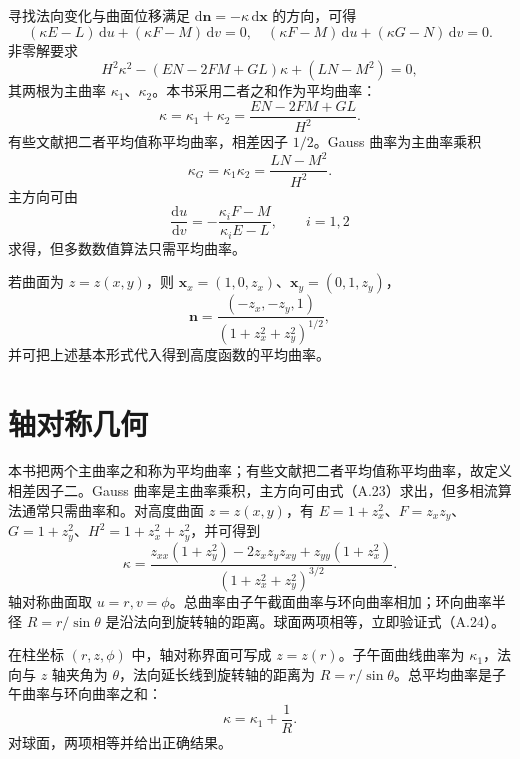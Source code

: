 \documentclass[11pt,a4paper,openany,fontset=none]{ctexbook}
\begin{document}
寻找法向变化与曲面位移满足 $\mathrm d\bm n=-\kappa\,\mathrm d\bm x$ 的方向，可得
\begin{equation}
 (\kappa E-L)\,\mathrm du+(\kappa F-M)\,\mathrm dv=0,
\quad
 (\kappa F-M)\,\mathrm du+(\kappa G-N)\,\mathrm dv=0. \tag{A.18}
\end{equation}
非零解要求
\begin{equation}
 H^2\kappa^2-(EN-2FM+GL)\kappa+(LN-M^2)=0, \tag{A.19}
\end{equation}
其两根为主曲率 $\kappa_1$、$\kappa_2$。本书采用二者之和作为平均曲率：
\begin{equation}
 \kappa=\kappa_1+\kappa_2=\frac{EN-2FM+GL}{H^2}. \tag{A.20--A.21}
\end{equation}
有些文献把二者平均值称平均曲率，相差因子 $1/2$。Gauss 曲率为主曲率乘积
\begin{equation}
 \kappa_G=\kappa_1\kappa_2=\frac{LN-M^2}{H^2}. \tag{A.22}
\end{equation}
主方向可由
\begin{equation}
 \frac{\mathrm du}{\mathrm dv}=-\frac{\kappa_iF-M}{\kappa_iE-L},\qquad i=1,2 \tag{A.23}
\end{equation}
求得，但多数数值算法只需平均曲率。

若曲面为 $z=z(x,y)$，则 $\bm x_x=(1,0,z_x)$、$\bm x_y=(0,1,z_y)$，
\begin{equation*}
 \bm n=\frac{(-z_x,-z_y,1)}{(1+z_x^2+z_y^2)^{1/2}},
\end{equation*}
并可把上述基本形式代入得到高度函数的平均曲率。

\section{轴对称几何}
本书把两个主曲率之和称为平均曲率；有些文献把二者平均值称平均曲率，故定义相差因子二。Gauss 曲率是主曲率乘积，主方向可由式（A.23）求出，但多相流算法通常只需曲率和。对高度曲面 $z=z(x,y)$，有 $E=1+z_x^2$、$F=z_xz_y$、$G=1+z_y^2$、$H^2=1+z_x^2+z_y^2$，并可得到
\[
 \kappa=\frac{z_{xx}(1+z_y^2)-2z_xz_yz_{xy}+z_{yy}(1+z_x^2)}{(1+z_x^2+z_y^2)^{3/2}}.
\]
轴对称曲面取 $u=r,v=\phi$。总曲率由子午截面曲率与环向曲率相加；环向曲率半径 $R=r/\sin\theta$ 是沿法向到旋转轴的距离。球面两项相等，立即验证式（A.24）。


在柱坐标 $(r,z,\phi)$ 中，轴对称界面可写成 $z=z(r)$。子午面曲线曲率为 $\kappa_1$，法向与 $z$ 轴夹角为 $\theta$，法向延长线到旋转轴的距离为 $R=r/\sin\theta$。总平均曲率是子午曲率与环向曲率之和：
\begin{equation}
 \kappa=\kappa_1+\frac1R. \tag{A.24}
\end{equation}
对球面，两项相等并给出正确结果。
\end{document}

